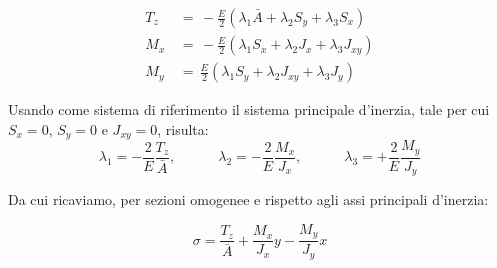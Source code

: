 \begin{align*}
    T_z \, &=\, -\frac{E}{2} \left( \lambda_1 \bar{A} + \lambda_2 S_y + \lambda_3 S_x \right) \\
    M_x \, &=\, -\frac{E}{2} \left( \lambda_1 S_x + \lambda_2 J_x + \lambda_3 J_{xy} \right) \\
    M_y \, &=\, \frac{E}{2} \left( \lambda_1 S_y + \lambda_2 J_{xy} + \lambda_3 J_y \right)
\end{align*}

Usando come sistema di riferimento il sistema principale d'inerzia, tale per cui $S_x = 0$, $S_y=0 $ e $J_{xy}=0$, risulta:
\begin{equation*}
    \lambda_1 = -\frac{2}{E}\frac{T_z}{\bar{A}}, \quad\quad\quad
    \lambda_2 = -\frac{2}{E}\frac{M_x}{J_x}, \quad\quad\quad
    \lambda_3 = +\frac{2}{E}\frac{M_y}{J_y}
\end{equation*}

Da cui ricaviamo, per sezioni omogenee e rispetto agli assi principali d'inerzia:

 \begin{equation*}
        \sigma = \frac{T_z}{\bar{A}} +  \frac{M_x}{J_x}y -\frac{M_y}{J_y}x 
 \end{equation*}


